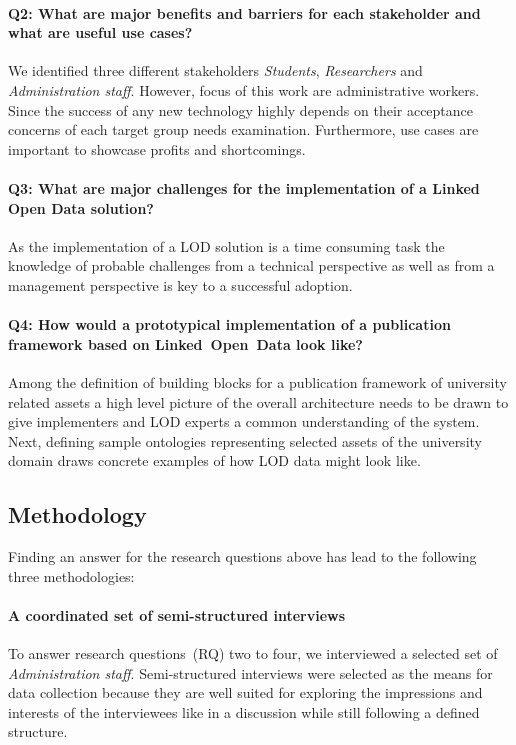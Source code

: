 \documentclass{article}
\begin{document}
\paragraph{Q2: What are major benefits and barriers for each stakeholder and what are useful use cases?}
We identified three different stakeholders \textit{Students}, \textit{Researchers} and \textit{Administration staff}.
However, focus of this work are administrative workers.
Since the success of any new technology highly depends on their acceptance concerns of each target group needs examination. Furthermore, use cases are important to showcase profits and shortcomings. 
\paragraph{Q3: What are major challenges for the implementation of a Linked Open Data solution?}
As the implementation of a LOD solution is a time consuming task the knowledge of probable challenges from a technical perspective as well as from a management perspective is key to a successful adoption. 
\paragraph{Q4: How would a prototypical implementation of a publication framework based on Linked~Open~Data look like?}
Among the definition of building blocks for a publication framework of university related assets a high level picture of the overall architecture needs to be drawn to give implementers and LOD experts a common understanding of the system. Next, defining sample ontologies representing selected assets of the university domain draws concrete examples of how LOD data might look like. 

\subsection{Methodology}
Finding an answer for the research questions above has lead to the following three methodologies:
\paragraph{A coordinated set of semi-structured interviews}
To answer research questions~(RQ) two to four, we interviewed a selected set of \textit{Administration staff}. Semi-structured interviews were selected as the means for data collection because they are well suited for exploring the impressions and interests of the interviewees like in a discussion while still following a defined structure. 
\end{document}
